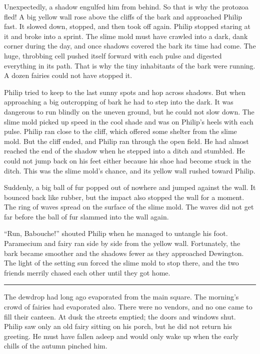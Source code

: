 \documentclass[10pt, draft]{memoir}
\renewcommand{\pfbreakdisplay}{\bigskip \ding{166} \bigskip}
\newcommand{\secbreak}{\fancybreak{\pfbreakdisplay}}
\begin{document}
Unexpectedly, a shadow engulfed him from behind. So that is why the protozoa fled! A big yellow wall rose above the cliffs of the bark and approached Philip fast. It slowed down, stopped, and then took off again. Philip stopped staring at it and broke into a sprint. The slime mold must have crawled into a dark, dank corner during the day, and once shadows covered the bark its time had come. The huge, throbbing cell pushed itself forward with each pulse and digested everything in its path. That is why the tiny inhabitants of the bark were running. A dozen fairies could not have stopped it.

Philip tried to keep to the last sunny spots and hop across shadows. But when approaching a big outcropping of bark he had to step into the dark. It was dangerous to run blindly on the uneven ground, but he could not slow down. The slime mold picked up speed in the cool shade and was on Philip's heels with each pulse. Philip ran close to the cliff, which offered some shelter from the slime mold. But the cliff ended, and Philip ran through the open field. He had almost reached the end of the shadow when he stepped into a ditch and stumbled. He could not jump back on his feet either because his shoe had become stuck in the ditch. This was the slime mold's chance, and its yellow wall rushed toward Philip.

Suddenly, a big ball of fur popped out of nowhere and jumped against the wall. It bounced back like rubber, but the impact also stopped the wall for a moment. The ring of waves spread on the surface of the slime mold. The waves did not get far before the ball of fur slammed into the wall again.

``Run, Babouche!'' shouted Philip when he managed to untangle his foot. Paramecium and fairy ran side by side from the yellow wall. Fortunately, the bark became smoother and the shadows fewer as they approached Dewington. The light of the setting sun forced the slime mold to stop there, and the two friends merrily chased each other until they got home.

\secbreak

The dewdrop had long ago evaporated from the main square. The morning’s crowd of fairies had evaporated also. There were no vendors, and no one came to fill their canteen. At dusk the streets emptied; the doors and windows shut. Philip saw only an old fairy sitting on his porch, but he did not return his greeting. He must have fallen asleep and would only wake up when the early chills of the autumn pinched him.
\end{document}
